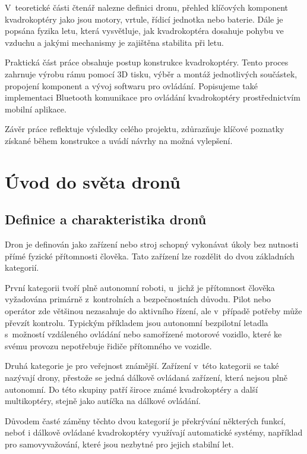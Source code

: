 \documentclass[12pt]{report}
\begin{document}
V~teoretické části čtenář nalezne definici dronu, přehled klíčových komponent kvadrokoptéry jako jsou motory, vrtule, řídicí jednotka nebo baterie. Dále je popsána fyzika letu, která vysvětluje, jak kvadrokoptéra dosahuje pohybu ve vzduchu a jakými mechanismy je zajištěna stabilita při letu.

Praktická část práce obsahuje postup konstrukce kvadrokoptéry. Tento proces zahrnuje výrobu rámu pomocí 3D tisku, výběr a montáž jednotlivých součástek, propojení komponent a vývoj softwaru pro ovládání. Popisujeme také implementaci Bluetooth komunikace pro ovládání kvadrokoptéry prostřednictvím mobilní aplikace.

Závěr práce reflektuje výsledky celého projektu, zdůrazňuje klíčové poznatky získané během konstrukce a uvádí návrhy na možná vylepšení.
\part[Úvod do světa dronů]{Úvod do světa dronů}  %

\chapter[Definice a charakteristika dronů]{Definice a charakteristika dronů}

Dron je definován jako zařízení nebo stroj schopný vykonávat úkoly bez nutnosti přímé fyzické přítomnosti člověka. Tato zařízení lze rozdělit do dvou základních kategorií.

První kategorii tvoří plně autonomní roboti, u~jichž je přítomnost člověka vyžadována primárně z~kontrolních a bezpečnostních důvodu. Pilot nebo operátor zde většinou nezasahuje do aktivního řízení, ale v~případě potřeby může převzít kontrolu. Typickým příkladem jsou autonomní bezpilotní letadla s~možností vzdáleného ovládání nebo samořízené motorové vozidlo, které ke svému provozu nepotřebuje řidiče přítomného ve vozidle.

Druhá kategorie je pro veřejnost známější. Zařízení v~této kategorii se také nazývají drony, přestože se jedná dálkově ovládaná zařízení, která nejsou plně autonomní. Do této skupiny patří široce známé kvadrokoptéry a další multikoptéry, stejně jako autíčka na dálkové ovládání.

Důvodem časté záměny těchto dvou kategorií je překrývání některých funkcí, neboť i dálkově ovládané kvadrokoptéry využívají automatické systémy, například pro samovyvažování, které jsou nezbytné pro jejich stabilní let. \cite{mainbook}
\end{document}
